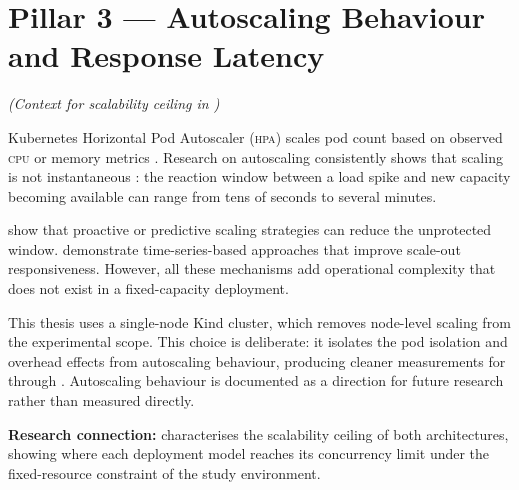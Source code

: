 \section{Pillar 3 --- Autoscaling Behaviour and Response Latency}
\textit{(Context for scalability ceiling in )}

Kubernetes Horizontal Pod Autoscaler (\textsc{hpa}) scales pod count based on observed
\textsc{cpu} or memory metrics \citep{nguyen2020}. Research on autoscaling consistently
shows that scaling is not instantaneous \citep{choi2021, li2025}: the reaction window
between a load spike and new capacity becoming available can range from tens of seconds to
several minutes.

\citet{casalicchio2019} show that proactive or predictive scaling strategies can reduce the
unprotected window. \citet{yuan2024} demonstrate time-series-based approaches that improve
scale-out responsiveness. However, all these mechanisms add operational complexity that
does not exist in a fixed-capacity \vm{} deployment.

This thesis uses a single-node Kind cluster, which removes node-level scaling from the
experimental scope. This choice is deliberate: it isolates the pod isolation and overhead
effects from autoscaling behaviour, producing cleaner measurements for  through
. Autoscaling behaviour is documented as a direction for future research rather than
measured directly.

\textbf{Research connection:}  characterises the scalability ceiling of both
architectures, showing where each deployment model reaches its concurrency limit under the
fixed-resource constraint of the study environment.
